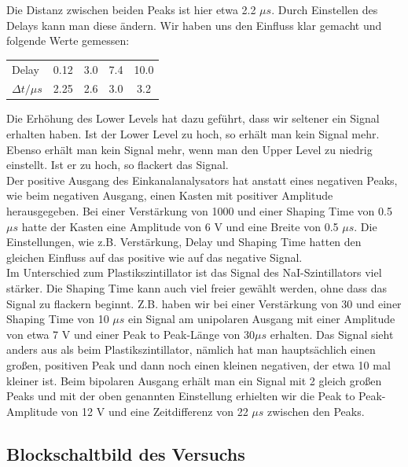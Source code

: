 Die Distanz zwischen beiden Peaks ist hier etwa 2.2 $\mu s$. Durch Einstellen des Delays kann man diese ändern. Wir haben uns den Einfluss klar gemacht und folgende Werte gemessen:\\

\begin{center}
\begin{tabular}{l c c c c}
Delay & 0.12 & 3.0 & 7.4 & 10.0\\
$\Delta t / \mu s$ & 2.25 & 2.6 & 3.0 & 3.2
\end{tabular}
\end{center}

Die Erhöhung des Lower Levels hat dazu geführt, dass wir seltener ein Signal erhalten haben. Ist der Lower Level zu hoch, so erhält man kein Signal mehr. Ebenso erhält man kein Signal mehr, wenn man den Upper Level zu niedrig einstellt. Ist er zu hoch, so flackert das Signal.\\

Der positive Ausgang des Einkanalanalysators hat anstatt eines negativen Peaks, wie beim negativen Ausgang, einen Kasten mit positiver Amplitude herausgegeben. Bei einer Verstärkung von 1000 und einer Shaping Time von 0.5 $\mu s$ hatte der Kasten eine Amplitude von 6 V und eine Breite von 0.5 $\mu s$. Die Einstellungen, wie z.B. Verstärkung, Delay und Shaping Time hatten den gleichen Einfluss auf das positive wie auf das negative Signal.\\

Im Unterschied zum Plastikszintillator ist das Signal des NaI-Szintillators viel stärker. Die Shaping Time kann auch viel freier gewählt werden, ohne dass das Signal zu flackern beginnt. Z.B. haben wir bei einer Verstärkung von 30 und einer Shaping Time von 10 $\mu s$ ein Signal am unipolaren Ausgang mit einer Amplitude von etwa 7 V und einer Peak to Peak-Länge von 30$\mu s$ erhalten. Das Signal sieht anders aus als beim Plastikszintillator, nämlich hat man hauptsächlich einen großen, positiven Peak und dann noch einen kleinen negativen, der etwa 10 mal kleiner ist. Beim bipolaren Ausgang erhält man ein Signal mit 2 gleich großen Peaks und mit der oben genannten Einstellung erhielten wir die Peak to Peak-Amplitude von 12 V und eine Zeitdifferenz von 22 $\mu s$ zwischen den Peaks.

\subsection{Blockschaltbild des Versuchs}

